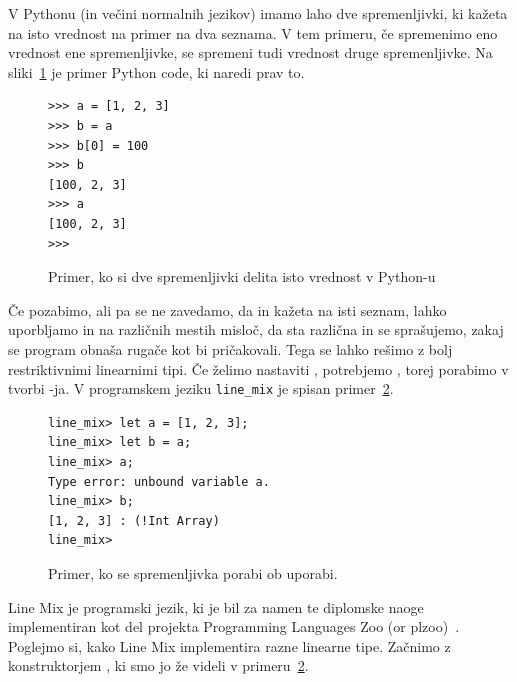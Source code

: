 \begin{primer}
    V Pythonu (in večini normalnih jezikov) imamo laho dve spremenljivki, ki kažeta na isto vrednost na primer na dva seznama. V tem primeru, če spremenimo eno vrednost ene spremenljivke, se spremeni tudi vrednost druge spremenljivke. Na sliki~\ref{python:seznami} je primer Python code, ki naredi prav to.
    \begin{center}
        \begin{figure}[htb]
            \begin{verbatim}
>>> a = [1, 2, 3]
>>> b = a
>>> b[0] = 100
>>> b
[100, 2, 3]
>>> a
[100, 2, 3]
>>> 
            \end{verbatim}
            \caption{Primer, ko si dve spremenljivki delita isto vrednost v Python-u}\label{python:seznami}
        \end{figure}
    \end{center}

    Če pozabimo, ali pa se ne zavedamo, da  in  kažeta na isti seznam, lahko uporbljamo  in  na različnih mestih misloč, da sta različna in se sprašujemo, zakaj se program obnaša rugače kot bi pričakovali. Tega se lahko rešimo z bolj restriktivnimi linearnimi tipi. Če želimo nastaviti , potrebjemo , torej porabimo  v tvorbi -ja. V programskem jeziku \verb|line_mix| je spisan primer~\ref{line_mix:seznami}. 
        \begin{center}
        \begin{figure}[ht]
            \begin{verbatim}
line_mix> let a = [1, 2, 3];
line_mix> let b = a;
line_mix> a;
Type error: unbound variable a.
line_mix> b;
[1, 2, 3] : (!Int Array)
line_mix> 
            \end{verbatim}
            \caption{Primer, ko se spremenljivka porabi ob uporabi.}\label{line_mix:seznami}
        \end{figure}
    \end{center}
\end{primer}

Line Mix je programski jezik, ki je bil za namen te diplomske naoge implementiran kot del projekta Programming Languages Zoo (or plzoo)~\cite{plzoo}. Poglejmo si, kako Line Mix implementira razne linearne tipe. Začnimo z konstruktorjem , ki smo jo že videli v primeru~\ref{line_mix:seznami}.

